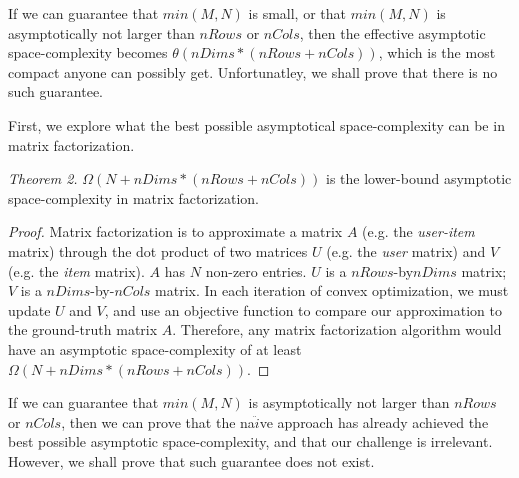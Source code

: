 If we can guarantee that $min(M,N)$ is small, or that $min(M,N)$ is asymptotically not larger than $nRows$ or $nCols$, 
then the effective asymptotic space-complexity becomes $\theta(nDims*(nRows+nCols))$, which is the most compact anyone can possibly get.  Unfortunatley, we shall prove that there is no such guarantee.  

First, we explore what the best possible asymptotical space-complexity can be in matrix factorization.


\emph{Theorem 2.}
$\Omega(N+nDims*(nRows+nCols))$ is the lower-bound asymptotic space-complexity in matrix factorization.
\begin{proof}  
Matrix factorization is to approximate a matrix $A$ (e.g. the \emph{user-item} matrix) through the dot product of two matrices $U$ (e.g. the \emph{user} matrix) and $V$ (e.g. the \emph{item} matrix). 
$A$ has $N$ non-zero entries.  $U$ is a $nRows$-by$nDims$ matrix; $V$ is a $nDims$-by-$nCols$ matrix.  
In each iteration of convex optimization, we must update $U$ and $V$, and use an objective function to compare our approximation to the ground-truth matrix $A$.  
Therefore, any matrix factorization algorithm would have an asymptotic space-complexity of at least $\Omega(N+nDims*(nRows+nCols))$.
\end{proof}


If we can guarantee that $min(M,N)$ is asymptotically not larger than $nRows$ or $nCols$, 
then we can prove that the na$\ddot{i}$ve approach has already achieved the best possible asymptotic space-complexity, and that our challenge is irrelevant.
However, we shall prove that such guarantee does not exist.


